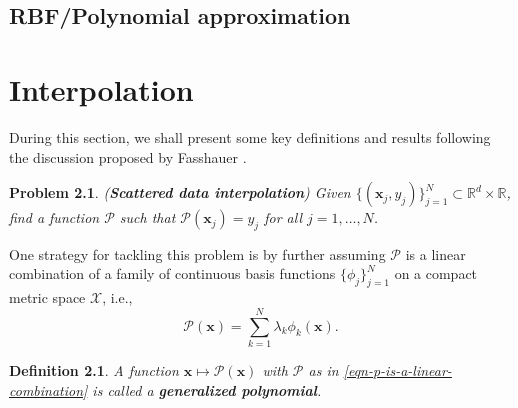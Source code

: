 \documentclass[12pt]{report} %
\newtheorem{definition}{Definition}
\newtheorem{problem}{Problem}
\newcommand{\tmmathbf}[1]{\ensuremath{\boldsymbol{#1}}}
\newcommand{\tmstrong}[1]{\textbf{#1}}
\begin{document}
\section{RBF/Polynomial approximation}

\chapter{Interpolation}

During this section, we shall present some key definitions and results
following the discussion proposed by Fasshauer \cite{fasshauer2007meshfree}.

\begin{problem}
  ({\tmstrong{Scattered data interpolation}}) Given $\{ (\tmmathbf{x}_j, y_j)
  \}_{j = 1}^N \subset \mathbb{R}^d \times \mathbb{R}$, find a function
  $\mathcal{P}$ such that $\mathcal{P} (\tmmathbf{x}_j) = y_j$ for all $j = 1,
  \ldots, N$.\label{interpolationproblemstatement}
\end{problem}

One strategy for tackling this problem is by further assuming $\mathcal{P}$ is
a linear combination of a family of continuous basis functions $\{ \phi_j
\}_{j = 1}^N$ on a compact metric space $\mathcal{X}$, i.e.,
\begin{equation}
  \mathcal{P} (\tmmathbf{x}) = \sum_{k = 1}^N \lambda_k \phi_k (\tmmathbf{x})
  . \label{eqn-p-is-a-linear-combination}
\end{equation}
\begin{definition}
  A function $\tmmathbf{x} \mapsto \mathcal{P} (\tmmathbf{x})$ with
  $\mathcal{P}$ as in \eqref{eqn-p-is-a-linear-combination} is called a
  {\tmstrong{generalized polynomial}}.
\end{definition}
\end{document}
